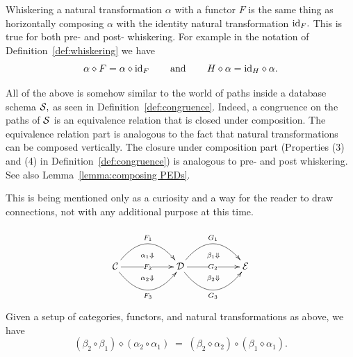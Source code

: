 \documentclass[CT4S-EN-RU]{subfiles}
\begin{document}
\begin{definitionRUS}\label{def:horizontal comp of nt}
\end{definitionRUS}

\begin{remarkENG}
Whiskering a natural transformation $\alpha$ with a functor $F$ is the same thing as horizontally composing $\alpha$ with the identity natural transformation $\textnormal{id}_F.$ This is true for both pre- and post- whiskering. For example in the notation of Definition~\ref{def:whiskering} we have 
$$\alpha\diamond F = \alpha\diamond\textnormal{id}_F\hspace{.3in}\textnormal{and}\hspace{.3in} H\diamond\alpha=\textnormal{id}_H\diamond\alpha.$$
\end{remarkENG}

\begin{remarkRUS}
\end{remarkRUS}

\begin{remarkENG}
All of the above is somehow similar to the world of paths inside a database schema $\mathcal{S},$ as seen in Definition~\ref{def:congruence}. Indeed, a congruence on the paths of $\mathcal{S}$ is an equivalence relation that is closed under composition. The equivalence relation part is analogous to the fact that natural transformations can be composed vertically. The closure under composition part (Properties (3) and (4) in Definition~\ref{def:congruence}) is analogous to pre- and post whiskering. See also Lemma~\ref{lemma:composing PEDs}. 

This is being mentioned only as a curiosity and a way for the reader to draw connections, not with any additional purpose at this time.
\end{remarkENG}

\begin{remarkRUS}
\end{remarkRUS}

\begin{theoremENG}
$$
\xymatrix{
&\ar@{}[d]|(.65){\alpha_1\Down}&&\ar@{}[d]|(.65){\beta_1\Down}\\
\mcC\ar@/^2pc/[rr]^{F_1}\ar[rr]|{F_2}\ar@/_2pc/[rr]_{F_3}&&\mcD\ar@/^2pc/[rr]^{G_1}\ar[rr]|{G_2}\ar@/_2pc/[rr]_{G_3}&&\mcE\\
&\ar@{}[u]|(.65){\alpha_2\Down}&&\ar@{}[u]|(.65){\beta_2\Down}}
$$
Given a setup of categories, functors, and natural transformations as above, we have
$$(\beta_2\circ\beta_1)\diamond(\alpha_2\circ\alpha_1)\;=\;(\beta_2\diamond\alpha_2)\circ(\beta_1\diamond\alpha_1).$$
\end{theoremENG}
\end{document}
